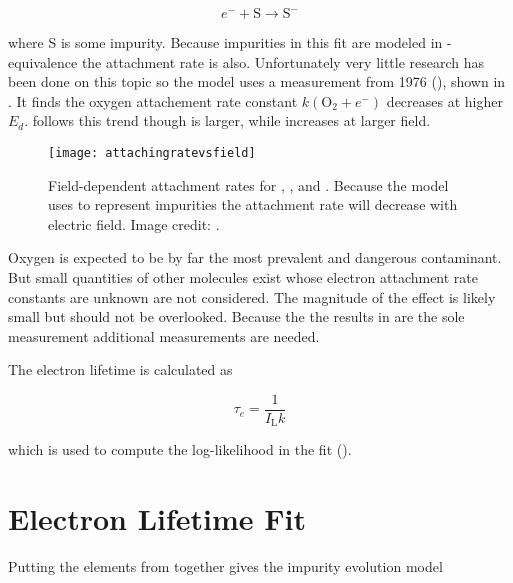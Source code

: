 \begin{equation}
e^- + \mathrm{S} \rightarrow \mathrm{S^-}
\end{equation}

\noindent where S is some impurity.  Because impurities in this fit are modeled in -equivalence the attachment rate is
also.  Unfortunately very little research has been done on this topic so the model uses a measurement from
1976 (), shown in .  It finds the oxygen attachement rate
constant $k(\mathrm{O_2} + e^-)$ decreases at higher $E_d$.   follows this trend though is larger, while
 increases at larger field.

\begin{figure}
\centering
\texttt{[image: attachingratevsfield]}
\caption{Field-dependent attachment rates for , , and .  Because the model uses  to represent
impurities the attachment rate will decrease with electric field.  Image credit: .}
\label{fig:electron_lifetime_model_field_attaching_rate}
\end{figure}

Oxygen is expected to be by far the most prevalent and dangerous contaminant.  But small
quantities of other molecules exist whose electron attachment rate constants are unknown are not considered.  The magnitude of the effect
is likely small but should not be overlooked.  Because the the results in  are
the sole measurement additional measurements are needed.

The electron lifetime is calculated as

\begin{equation}
\tau_e = \frac{1}{I_{\mathrm{L}} k}
\label{eq:electron_lifetime_model_field_lifetime}
\end{equation}

\noindent which is used to compute the log-likelihood in the fit (\secref{}).



\section{Electron Lifetime Fit}
\label{sec:elifetime_fit}
Putting the elements from  together gives the impurity evolution model

